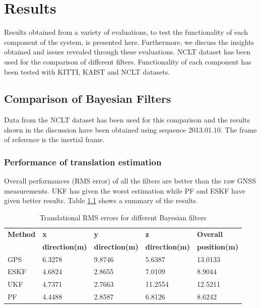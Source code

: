 \chapter{Results}
\label{chapter:results}
Results obtained from a variety of evaluations, to test the functionality of each component of the system, is presented here. Furthermore, we discuss the insights obtained and issues revealed through these evaluations. \gls{NCLT} dataset has been used for the comparison of different filters. Functionality of each component has been tested with \gls{KITTI}, \gls{KAIST} and \gls{NCLT} datasets.



\section{Comparison of Bayesian Filters}
\label{sec:BayesianFilterComparison}
Data from the \gls{NCLT} dataset has been used for this comparison and the results shown in the discussion have been obtained using sequence 2013.01.10. The frame of reference is the inertial frame.
\subsection{Performance of translation estimation}
Overall performances (\gls{RMS} error) of all the filters are better than the raw \gls{GNSS} measurements. \gls{UKF} has given the worst estimation while \gls{PF} and \gls{ESKF} have given better results. Table \ref{table:ch:RMSErrorPosition} shows a summary of the results.
\begin{table}[htp]
    \centering
    \begin{tabular}{|p{2.5cm}|p{2.5cm}|p{2.5cm}|p{2.5cm}|p{2.5cm}|} 
        \hline
        \textbf{Method} & \textbf{x} & \textbf{y} & \textbf{z}& \textbf{Overall} \\
        \textbf{} & \textbf{direction(m)} & \textbf{direction(m)} & \textbf{direction(m)}& \textbf{position(m)} \\
        \hline
        GPS&6.3278 &9.8746 &5.6387& 13.0133\\
        \hline
        ESKF &4.6824& 2.8655 &7.0109 &8.9044\\
        \hline
        UKF &4.7371& 2.7663 &11.2554 &12.5211
        \\
        \hline
        PF& 4.4488& 2.8587& 6.8126& 8.6242
        \\
        \hline
    \end{tabular}
\caption{Translational RMS errors for different Bayesian filters}
\label{table:ch:RMSErrorPosition}
\end{table}

